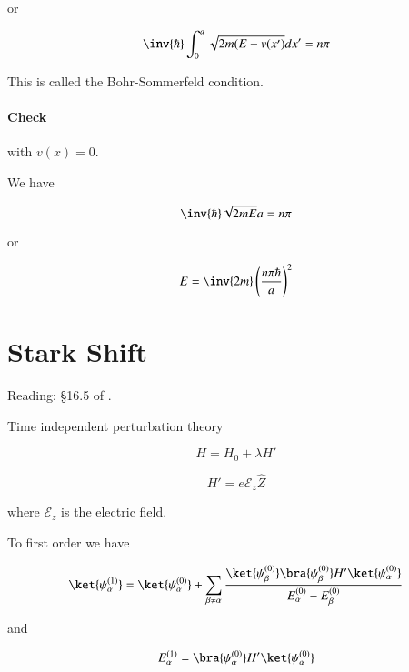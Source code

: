 or

\begin{equation}\label{eqn:qmTwoR3:190}
\inv{\hbar} \int_0^a \sqrt{2 m (E - v(x')} dx' = n \pi
\end{equation}

This is called the Bohr-Sommerfeld condition.

\paragraph{Check} with $v(x) = 0$.

We have

\begin{equation}\label{eqn:qmTwoR3:210}
\inv{\hbar} \sqrt{2m E} a = n \pi
\end{equation}

or

\begin{equation}\label{eqn:qmTwoR3:230}
E = \inv{2m} \left(\frac{n \pi \hbar}{a}\right)^2
\end{equation}

\section{Stark Shift}

Reading: \S 16.5 of \cite{desai2009quantum}.

Time independent perturbation theory

\begin{equation}\label{eqn:qmTwoR3:250}
H = H_0 + \lambda H'
\end{equation}

\begin{equation}\label{eqn:qmTwoR3:270}
H' = e \mathcal{E}_z \hat{Z}
\end{equation}

where $\mathcal{E}_z$ is the electric field.

To first order we have

\begin{equation}\label{eqn:qmTwoR3:290}
\ket{\psi_\alpha^{(1)}} = \ket{\psi_\alpha^{(0)}} 
+ 
\sum_{\beta \ne \alpha} \frac{ 
\ket{\psi_\beta^{(0)}} \bra{\psi_\beta^{(0)}} H' \ket{\psi_\alpha^{(0)}} 
}{
E_\alpha^{(0)} 
-E_\beta^{(0)} 
}
\end{equation}

and 

\begin{equation}\label{eqn:qmTwoR3:310}
E_\alpha^{(1)} = 
\bra{\psi_\alpha^{(0)}} H' \ket{\psi_\alpha^{(0)}} 
\end{equation}

